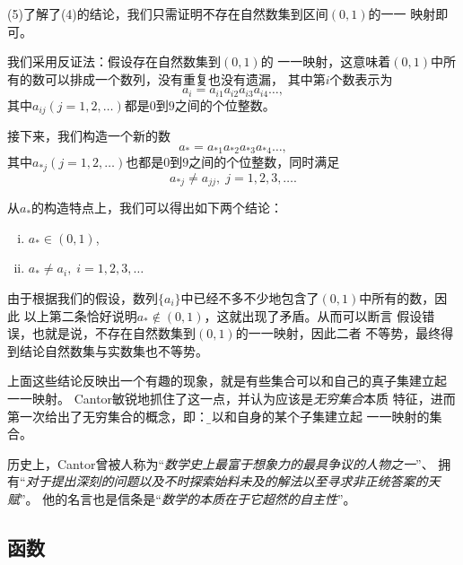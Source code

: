 \begin{shaded}
	(5)\;了解了(4)的结论，我们只需证明不存在自然数集到区间$(0,1)$的一一
	映射即可。
	
	我们采用反证法：假设存在自然数集到$(0,1)$的
	一一映射，这意味着$(0,1)$中所有的数可以排成一个数列，没有重复也没有遗漏，
	其中第$i$个数表示为
	$$a_i=a_{i1}a_{i2}a_{i3}a_{i4}\ldots,$$
	其中$a_{ij}(j=1,2,\ldots)$都是$0$到$9$之间的个位整数。
	
	接下来，我们构造一个新的数
	$$a_*=a_{*1}a_{*2}a_{*3}a_{*4}\ldots,$$
	其中$a_{*j}(j=1,2,\ldots)$也都是$0$到$9$之间的个位整数，同时满足
	$$a_{*j}\ne a_{jj},\; j=1,2,3,\ldots.$$
	
	从$a_*$的构造特点上，我们可以得出如下两个结论：
	\begin{enumerate}[(i)]
	  \setlength{\itemindent}{1cm}
	  \item $a_*\in(0,1)$,
	  \item $a_*\ne a_i,\;i=1,2,3,\ldots$
	\end{enumerate}
	由于根据我们的假设，数列$\{a_i\}$中已经不多不少地包含了$(0,1)$中所有的数，因此
	以上第二条恰好说明$a_*\notin(0,1)$，这就出现了矛盾。从而可以断言
	假设错误，也就是说，不存在自然数集到$(0,1)$的一一映射，因此二者
	不等势，最终得到结论自然数集与实数集也不等势。
	
	上面这些结论反映出一个有趣的现象，就是有些集合可以和自己的真子集建立起
	一一映射。	Cantor敏锐地抓住了这一点，并认为应该是{\b\it 无穷集合}本质
	特征，进而第一次给出了无穷集合的概念，即：{\b 可以和自身的某个子集建立起
	一一映射的集合。}
	
	历史上，Cantor曾被人称为“{\it 数学史上最富于想象力的最具争议的人物之一}”、
	拥有“{\it 对于提出深刻的问题以及不时探索始料未及的解法以至寻求非正统答案的天赋}”。
	他的名言也是信条是“{\it 数学的本质在于它超然的自主性}”。
\end{shaded}	

	
\subsection{函数}
	
